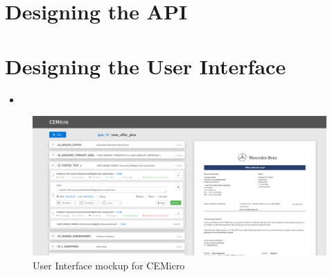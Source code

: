 \section{Designing the API}


\section{Designing the User Interface}

\begin{itemize}
  \item {}
\end{itemize}

\begin{figure}
  \centering
  \includegraphics[width=\linewidth]{assets/cemicro-ui-mockup.png}
  \caption{User Interface mockup for CEMicro}
  \label{fig:mockup}
\end{figure}


